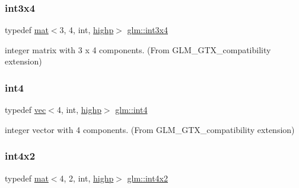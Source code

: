 \subsubsection{\texorpdfstring{int3x4}{int3x4}}
{\footnotesize\ttfamily typedef \hyperlink{structglm_1_1mat}{mat}$<$3, 4, int, \hyperlink{namespaceglm_a36ed105b07c7746804d7fdc7cc90ff25ac6f7eab42eacbb10d59a58e95e362074}{highp}$>$ \hyperlink{group__gtx__compatibility_gaaf72af875fd64f43606aa083d2374195}{glm\+::int3x4}}



integer matrix with 3 x 4 components. (From G\+L\+M\+\_\+\+G\+T\+X\+\_\+compatibility extension) 

\mbox{\label{group__gtx__compatibility_ga19f0c43f626567ad3ca888b8ad0d0093}} 
\subsubsection{\texorpdfstring{int4}{int4}}
{\footnotesize\ttfamily typedef \hyperlink{structglm_1_1vec}{vec}$<$4, int, \hyperlink{namespaceglm_a36ed105b07c7746804d7fdc7cc90ff25ac6f7eab42eacbb10d59a58e95e362074}{highp}$>$ \hyperlink{group__gtx__compatibility_ga19f0c43f626567ad3ca888b8ad0d0093}{glm\+::int4}}



integer vector with 4 components. (From G\+L\+M\+\_\+\+G\+T\+X\+\_\+compatibility extension) 

\mbox{\label{group__gtx__compatibility_ga217e382844361bca6a376e72efa4b360}} 
\subsubsection{\texorpdfstring{int4x2}{int4x2}}
{\footnotesize\ttfamily typedef \hyperlink{structglm_1_1mat}{mat}$<$4, 2, int, \hyperlink{namespaceglm_a36ed105b07c7746804d7fdc7cc90ff25ac6f7eab42eacbb10d59a58e95e362074}{highp}$>$ \hyperlink{group__gtx__compatibility_ga217e382844361bca6a376e72efa4b360}{glm\+::int4x2}}



